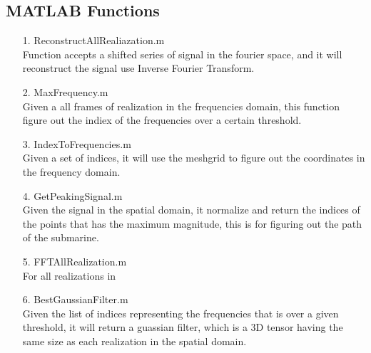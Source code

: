 \documentclass{article}
\begin{document}
\begin{appendices}
\section{MATLAB Functions}
    \begin{enumerate}
        \item[1.] ReconstructAllRealiazation.m \\
        Function accepts a shifted series of signal in the fourier space, and it will reconstruct the signal use Inverse Fourier Transform.  
        \item[2.] MaxFrequency.m \\
        Given a all frames of realization in the frequencies domain, this function figure out the indiex of the frequencies over a certain threshold. 
        \item[3.] IndexToFrequencies.m \\
        Given a set of indices, it will use the meshgrid to figure out the coordinates in the frequency domain. 
        \item[4.] GetPeakingSignal.m \\
        Given the signal in the spatial domain, it normalize and return the indices of the points that has the maximum magnitude, this is for figuring out the path of the submarine. 
        \item[5.] FFTAllRealization.m \\
        For all realizations in 
        \item[6.] BestGaussianFilter.m \\
        Given the list of indices representing the frequencies that is over a given threshold, it will return a guassian filter, which is a 3D tensor having the same size as each realization in the spatial domain. 
    \end{enumerate}
    
\end{appendices}
\end{document}

